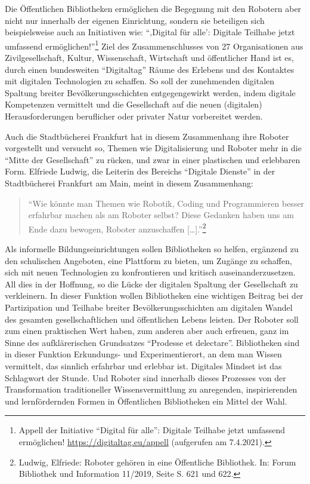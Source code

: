 \documentclass[a4paper,
fontsize=11pt,
oneside,
numbers=noperiodatend,
parskip=half-,
bibliography=totoc,
final
]{scrartcl}
\begin{document}
Die Öffentlichen Bibliotheken ermöglichen die Begegnung mit den Robotern
aber nicht nur innerhalb der eigenen Einrichtung, sondern sie beteiligen
sich beispielsweise auch an Initiativen wie: \enquote{‚Digital für
alle': Digitale Teilhabe jetzt umfassend ermöglichen!}\footnote{Appell
  der Initiative \enquote{Digital für alle}: Digitale Teilhabe jetzt
  umfassend ermöglichen! \url{https://digitaltag.eu/appell} (aufgerufen
  am 7.4.2021).} Ziel des Zusammenschlusses von 27 Organisationen aus
Zivilgesellschaft, Kultur, Wissenschaft, Wirtschaft und öffentlicher
Hand ist es, durch einen bundesweiten \enquote{Digitaltag} Räume des
Erlebens und des Kontaktes mit digitalen Technologien zu schaffen. So
soll der zunehmenden digitalen Spaltung breiter Bevölkerungsschichten
entgegengewirkt werden, indem digitale Kompetenzen vermittelt und die
Gesellschaft auf die neuen (digitalen) Herausforderungen beruflicher
oder privater Natur vorbereitet werden.

Auch die Stadtbücherei Frankfurt hat in diesem Zusammenhang ihre Roboter
vorgestellt und versucht so, Themen wie Digitalisierung und Roboter mehr
in die \enquote{Mitte der Gesellschaft} zu rücken, und zwar in einer
plastischen und erlebbaren Form. Elfriede Ludwig, die Leiterin des
Bereichs \enquote{Digitale Dienste} in der Stadtbücherei Frankfurt am Main,
meint in diesem Zusammenhang: 

\begin{quote}
\enquote{Wie könnte man Themen wie
Robotik, Coding und Programmieren besser erfahrbar machen als am Roboter
selbst? Diese Gedanken haben uns am Ende dazu bewogen, Roboter
anzuschaffen {[}\ldots{]}.}\footnote{Ludwig, Elfriede: Roboter gehören
  in eine Öffentliche Bibliothek. In: Forum Bibliothek und Information
  11/2019, Seite S. 621 und 622.} 
 \end{quote}
  
Als informelle Bildungseinrichtungen
sollen Bibliotheken so helfen, ergänzend zu den schulischen Angeboten,
eine Plattform zu bieten, um Zugänge zu schaffen, sich mit neuen
Technologien zu konfrontieren und kritisch auseinanderzusetzen. All dies
in der Hoffnung, so die Lücke der digitalen Spaltung der Gesellschaft zu
verkleinern. In dieser Funktion wollen Bibliotheken eine wichtigen
Beitrag bei der Partizipation und Teilhabe breiter Bevölkerungsschichten
am digitalen Wandel des gesamten gesellschaftlichen und öffentlichen
Lebens leisten. Der Roboter soll zum einen praktischen Wert haben, zum anderen
aber auch erfreuen, ganz im Sinne des aufklärerischen Grundsatzes
\enquote{Prodesse et delectare}. Bibliotheken sind in dieser Funktion
Erkundungs- und Experimentierort, an dem man Wissen vermittelt, das
sinnlich erfahrbar und erlebbar ist. Digitales Mindset ist das
Schlagwort der Stunde. Und Roboter sind innerhalb dieses Prozesses von
der Transformation traditioneller Wissensvermittlung zu anregenden,
inspirierenden und lernfördernden Formen in Öffentlichen Bibliotheken
ein Mittel der Wahl.
\end{document}
